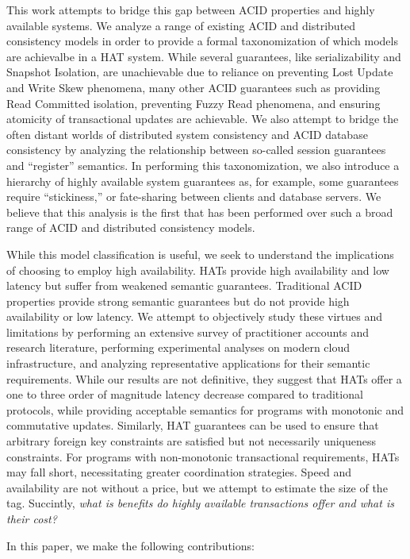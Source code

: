 This work attempts to bridge this gap between ACID properties and
highly available systems. We analyze a range of existing ACID and
distributed consistency models in order to provide a formal
taxonomization of which models are achievalbe in a HAT system.  While
several guarantees, like serializability and Snapshot Isolation, are
unachievable due to reliance on preventing Lost Update and Write Skew
phenomena, many other ACID guarantees such as providing Read Committed
isolation, preventing Fuzzy Read phenomena, and ensuring atomicity of
transactional updates are achievable. We also attempt to bridge the
often distant worlds of distributed system consistency and ACID
database consistency by analyzing the relationship between so-called
session guarantees and ``register'' semantics. In performing this
taxonomization, we also introduce a hierarchy of highly available
system guarantees as, for example, some guarantees require
``stickiness,'' or fate-sharing between clients and database
servers. We believe that this analysis is the first that has been
performed over such a broad range of ACID and distributed consistency
models.

While this model classification is useful, we seek to understand the
implications of choosing to employ high availability. HATs provide
high availability and low latency but suffer from weakened semantic
guarantees. Traditional ACID properties provide strong semantic
guarantees but do not provide high availability or low latency. We
attempt to objectively study these virtues and limitations by
performing an extensive survey of practitioner accounts and research
literature, performing experimental analyses on modern cloud
infrastructure, and analyzing representative applications for their
semantic requirements. While our results are not definitive, they
suggest that HATs offer a one to three order of magnitude latency
decrease compared to traditional protocols, while providing acceptable
semantics for programs with monotonic and commutative
updates. Similarly, HAT guarantees can be used to ensure that
arbitrary foreign key constraints are satisfied but not necessarily
uniqueness constraints. For programs with non-monotonic transactional
requirements, HATs may fall short, necessitating greater coordination
strategies. Speed and availability are not without a price, but we
attempt to estimate the size of the tag. Succintly, \textit{what is
  benefits do highly available transactions offer and what is their
  cost?}

In this paper, we make the following contributions:

